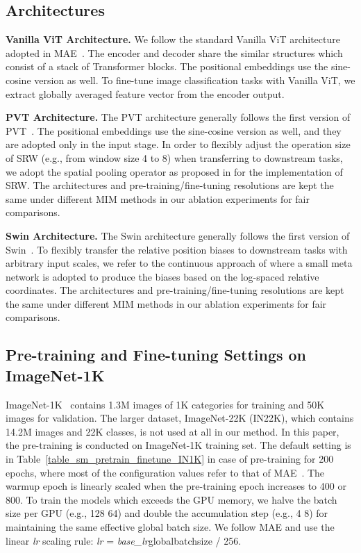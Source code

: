 \documentclass{article}
\begin{document}
\subsection{Architectures}
\textbf{Vanilla ViT Architecture.} We follow the standard Vanilla ViT architecture adopted in MAE~\cite{he2021masked}. The encoder and decoder share the similar structures which consist of a stack of Transformer blocks. The positional embeddings use the sine-cosine version as well. To fine-tune image classification tasks with Vanilla ViT, we extract globally averaged feature vector from the encoder output.

\textbf{PVT Architecture.} The PVT architecture generally follows the first version of PVT~\cite{wang2021pyramid}. The positional embeddings use the sine-cosine version as well, and they are adopted only in the input stage. In order to flexibly adjust the operation size of SRW (e.g., from window size 4 to 8) when transferring to downstream tasks, we adopt the spatial pooling operator as proposed in \cite{wang2022pvtv2} for the implementation of SRW. The architectures and pre-training/fine-tuning resolutions are kept the same under different MIM methods in our ablation experiments for fair comparisons.

\textbf{Swin Architecture.} The Swin architecture generally follows the first version of Swin~\cite{liu2021swin}. To flexibly transfer the relative position biases to downstream tasks with arbitrary input scales, we refer to the continuous approach of \cite{liu2021swinv2} where a small meta network is adopted to produce the biases based on the log-spaced relative coordinates. The architectures and pre-training/fine-tuning resolutions are kept the same under different MIM methods in our ablation experiments for fair comparisons.



\subsection{Pre-training and Fine-tuning Settings on ImageNet-1K}
ImageNet-1K~\cite{deng2009imagenet} contains 1.3M images of 1K categories for training and 50K images for validation. The larger dataset, ImageNet-22K (IN22K), which contains 14.2M
images and 22K classes, is not used at all in our method. 
In this paper, the pre-training is conducted on ImageNet-1K training set. The default setting is in Table~\ref{table_sm_pretrain_finetune_IN1K} in case of pre-training for 200 epochs, where most of the configuration values refer to that of MAE~\cite{he2021masked}. The warmup epoch is linearly scaled when the pre-training epoch increases to 400 or 800. To train the models which exceeds the GPU memory, we halve the batch size per GPU (e.g., 128  64) and double the accumulation step (e.g., 4  8) for maintaining the same effective global batch size. We follow MAE and use the linear \textit{lr} scaling rule: \textit{lr} = \textit{base\_lr}globalbatchsize / 256.
\end{document}
